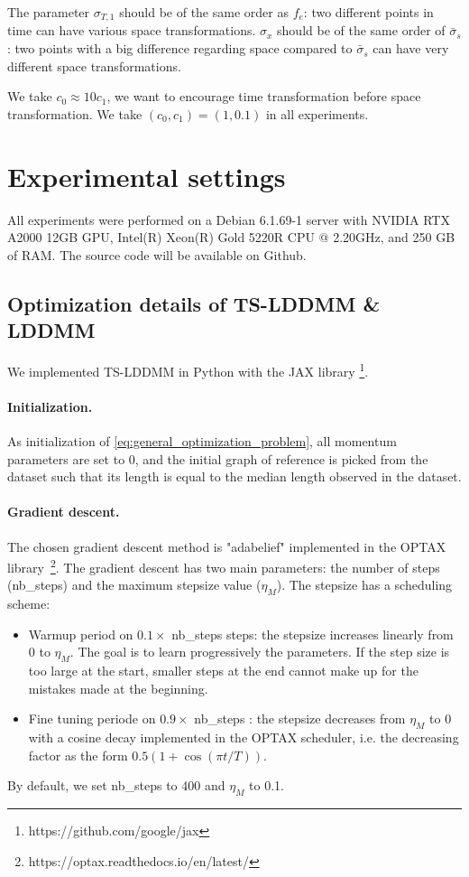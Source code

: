 The parameter $\sigma_{T,1}$ should be of the same order as $f_e$: two different points in time can have various space transformations.
 $\sigma_x$ should be of the same order of $\bar{\sigma}_s$: two points with a big difference regarding space compared to $\bar{\sigma}_s$ can have very different space transformations.

 We take $c_0\approx 10 c_1 $, we want to encourage time transformation before space transformation. We take $(c_0,c_1)=(1,0.1)$ in all experiments.


\section{Experimental settings}

All experiments were performed on a Debian 6.1.69-1 server with NVIDIA RTX A2000 12GB GPU, Intel(R) Xeon(R) Gold 5220R CPU @ 2.20GHz, and 250 GB of RAM. The source code will be available on Github.

\subsection{Optimization details of TS-LDDMM \& LDDMM}
\label{appendix:optimizers_details}

We implemented TS-LDDMM in Python with the JAX library \footnote{https://github.com/google/jax}.

\paragraph{Initialization.}
As initialization of \eqref{eq:general_optimization_problem}, all momentum parameters are set to $0$, and the initial graph of reference is picked from the dataset such that its length is equal to the median length observed in the dataset.

\paragraph{Gradient descent.}
The chosen gradient descent method is "adabelief" \cite{zhuang2020adabelief} implemented in the OPTAX library~\footnote{https://optax.readthedocs.io/en/latest/}.
The gradient descent has two main parameters: the number of steps (nb\_steps) and the maximum stepsize value ($\eta_M$).
The stepsize has a scheduling scheme: 
\begin{itemize}
  \item Warmup period on $0.1 \times$ nb\_steps steps: the stepsize increases linearly from $0$ to $\eta_M$. The goal is to learn progressively the parameters. If the step size is too large at the start, smaller steps at the end cannot make up for the mistakes made at the beginning. 
  \item Fine tuning periode on $ 0.9  \times$ nb\_steps : the stepsize decreases from $\eta_M$ to $0$ with a cosine decay implemented in the OPTAX scheduler, i.e. the decreasing factor as the form $0.5  (1 + \cos(\pi  t/T))$. 
\end{itemize}
By default, we set nb\_steps to 400 and $\eta_M$ to 0.1.

